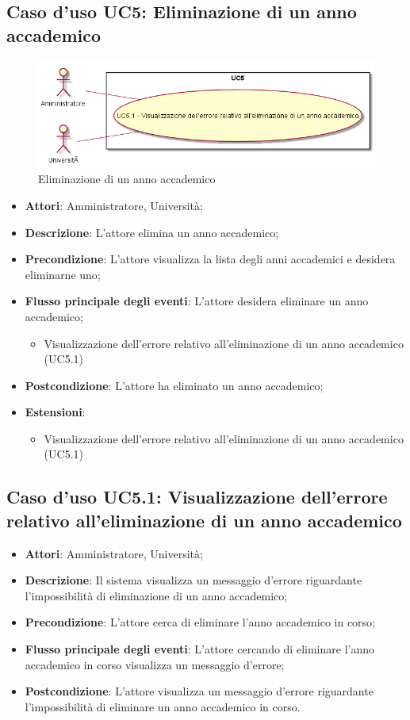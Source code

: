 \subsection{Caso d'uso \texorpdfstring{UC5}{UC5}: Eliminazione di un anno accademico}
\begin{figure} [H]
\centering
\includegraphics[scale=0.45]{./img/UC5.png}
\caption{Eliminazione di un anno accademico}\label{}
\end{figure}
\begin{itemize}
\item \textbf{Attori}: Amministratore, Università;
\item \textbf{Descrizione}: L'attore elimina un anno accademico;
\item \textbf{Precondizione}: L'attore visualizza la lista degli anni accademici e desidera eliminarne uno;
\item \textbf{Flusso principale degli eventi}: L'attore desidera eliminare un anno accademico;
\begin{itemize}
\item Visualizzazione dell'errore relativo all'eliminazione di un anno accademico (UC5.1)
\end{itemize}
\item \textbf{Postcondizione}: L'attore ha eliminato un anno accademico;
\item \textbf{Estensioni}:
\begin{itemize}
\item Visualizzazione dell'errore relativo all'eliminazione di un anno accademico (UC5.1)
\end{itemize}
\end{itemize}
\subsection{Caso d'uso \texorpdfstring{UC5.1}{UC5.1}: Visualizzazione dell'errore relativo all'eliminazione di un anno accademico}
\begin{itemize}
\item \textbf{Attori}: Amministratore, Università;
\item \textbf{Descrizione}: Il sistema visualizza un messaggio d'errore riguardante l'impossibilità di eliminazione di un anno accademico;
\item \textbf{Precondizione}: L'attore cerca di eliminare l'anno accademico in corso;
\item \textbf{Flusso principale degli eventi}: L'attore cercando di eliminare l'anno accademico in corso visualizza un messaggio d'errore;
\item \textbf{Postcondizione}: L'attore visualizza un messaggio d'errore riguardante l'impossibilità di eliminare un anno accademico in corso.
\end{itemize}
